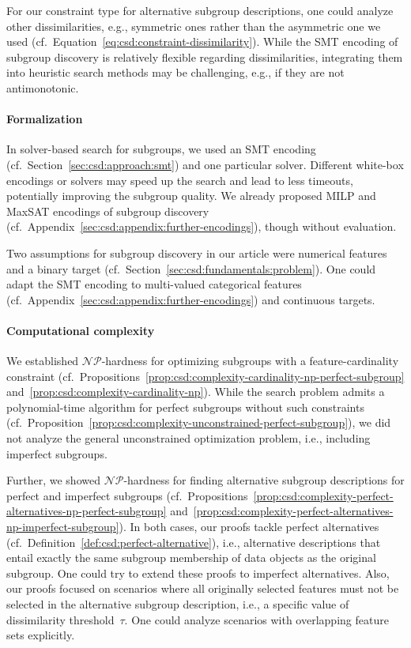 \documentclass{article}
\theoremstyle{definition}
\begin{document}
For our constraint type for alternative subgroup descriptions, one could analyze other dissimilarities, e.g., symmetric ones rather than the asymmetric one we used (cf.~Equation~\ref{eq:csd:constraint-dissimilarity}).
While the SMT encoding of subgroup discovery is relatively flexible regarding dissimilarities, integrating them into heuristic search methods may be challenging, e.g., if they are not antimonotonic.

\paragraph{Formalization}

In solver-based search for subgroups, we used an SMT encoding (cf.~Section~\ref{sec:csd:approach:smt}) and one particular solver.
Different white-box encodings or solvers may speed up the search and lead to less timeouts, potentially improving the subgroup quality.
We already proposed MILP and MaxSAT encodings of subgroup discovery (cf.~Appendix~\ref{sec:csd:appendix:further-encodings}), though without evaluation.

Two assumptions for subgroup discovery in our article were numerical features and a binary target (cf.~Section~\ref{sec:csd:fundamentals:problem}).
One could adapt the SMT encoding to multi-valued categorical features (cf.~Appendix~\ref{sec:csd:appendix:further-encodings}) and continuous targets.

\paragraph{Computational complexity}

We established $\mathcal{NP}$-hardness for optimizing subgroups with a feature-cardinality constraint (cf.~Propositions~\ref{prop:csd:complexity-cardinality-np-perfect-subgroup} and~\ref{prop:csd:complexity-cardinality-np}).
While the search problem admits a polynomial-time algorithm for perfect subgroups without such constraints (cf.~Proposition~\ref{prop:csd:complexity-unconstrained-perfect-subgroup}), we did not analyze the general unconstrained optimization problem, i.e., including imperfect subgroups.

Further, we showed $\mathcal{NP}$-hardness for finding alternative subgroup descriptions for perfect and imperfect subgroups (cf.~Propositions~\ref{prop:csd:complexity-perfect-alternatives-np-perfect-subgroup} and~\ref{prop:csd:complexity-perfect-alternatives-np-imperfect-subgroup}).
In both cases, our proofs tackle perfect alternatives (cf.~Definition~\ref{def:csd:perfect-alternative}), i.e., alternative descriptions that entail exactly the same subgroup membership of data objects as the original subgroup.
One could try to extend these proofs to imperfect alternatives.
Also, our proofs focused on scenarios where all originally selected features must not be selected in the alternative subgroup description, i.e., a specific value of dissimilarity threshold~$\tau$.
One could analyze scenarios with overlapping feature sets explicitly.
\end{document}
